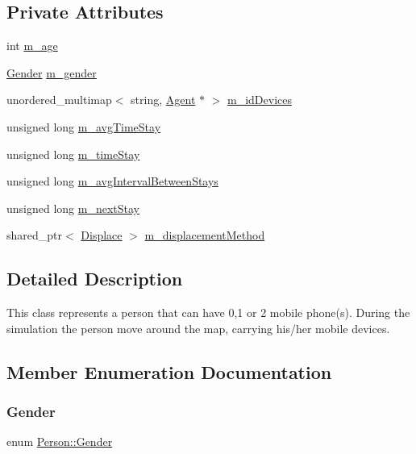 \subsection*{Private Attributes}
\begin{DoxyCompactItemize}
\item 
int \hyperlink{class_person_a743e071da10a5ac9150f61df919cfbb4}{m\+\_\+age}
\item 
\hyperlink{class_person_aff84ca16bd4dbf364614d86f20b29dd2}{Gender} \hyperlink{class_person_ade9cdf49acde95c75f19f0b0d24c8c9a}{m\+\_\+gender}
\item 
unordered\+\_\+multimap$<$ string, \hyperlink{class_agent}{Agent} $\ast$ $>$ \hyperlink{class_person_a95b2e60a54b72aea51a7600048e76291}{m\+\_\+id\+Devices}
\item 
unsigned long \hyperlink{class_person_a8c9502459dd59182d11f60f429b44457}{m\+\_\+avg\+Time\+Stay}
\item 
unsigned long \hyperlink{class_person_a5554109f1f3a7c466f02346d0061c6e7}{m\+\_\+time\+Stay}
\item 
unsigned long \hyperlink{class_person_a62a07c9565931a618a09be7510dde07c}{m\+\_\+avg\+Interval\+Between\+Stays}
\item 
unsigned long \hyperlink{class_person_ad8809184fc32b28b1bcc115b10493b55}{m\+\_\+next\+Stay}
\item 
shared\+\_\+ptr$<$ \hyperlink{class_displace}{Displace} $>$ \hyperlink{class_person_a92ceead10a7ca858d2151391e4421843}{m\+\_\+displacement\+Method}
\end{DoxyCompactItemize}


\subsection{Detailed Description}
This class represents a person that can have 0,1 or 2 mobile phone(s). During the simulation the person move around the map, carrying his/her mobile devices. 

\subsection{Member Enumeration Documentation}
\mbox{\label{class_person_aff84ca16bd4dbf364614d86f20b29dd2}} 
\subsubsection{\texorpdfstring{Gender}{Gender}}
{\footnotesize\ttfamily enum \hyperlink{class_person_aff84ca16bd4dbf364614d86f20b29dd2}{Person\+::\+Gender}}

